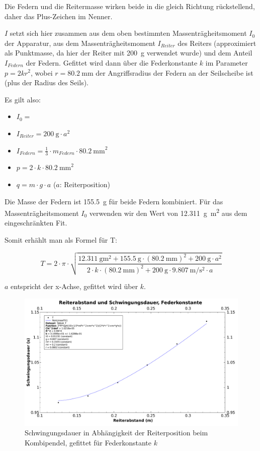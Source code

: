 Die Federn und die Reitermasse wirken beide in die gleich Richtung r\"uckstellend,
daher das Plus-Zeichen im Nenner.

$I$ setzt sich  hier zusammen aus dem  oben bestimmten Massentr\"agheitsmoment
$I_0$ der Apparatur, aus  dem Massentr\"agheitsmoment $I_{Reiter}$ des Reiters
(approximiert  als   Punktmasse,  da  hier  der   Reiter  mit  \SI{200}{\gram}
verwendet  wurde)  und  dem  Anteil  $I_{Federn}$  der  Federn. Gefittet  wird
dann  \"uber die  Federkonstante $k$  im  Parameter $p  = 2kr^2$,  wobei $r  =
\SI{80.2}{\milli\meter}$ der Angriffsradius der  Federn an der Seilscheibe ist
(plus der Radius des Seils).

Es gilt also:
\begin{itemize}
    \item
        $I_0 = $
    \item
        $I_{Reiter} = \SI{200}{\gram} \cdot a^2$
    \item
        $I_{Federn} = \frac{1}{3} \cdot m_{Federn} \cdot \SI{80.2}{\milli\meter}^2$
    \item
        $p = 2 \cdot k \cdot \SI{80.2}{\milli\meter}^2$
    \item
        $q = m \cdot g \cdot a$ ($a$: Reiterposition)
\end{itemize}

Die   Masse   der   Federn    ist   \SI{155.5}{\gram}   f\"ur   beide   Federn
kombiniert. F\"ur das Massentr\"agheitsmoment $I_0$ verwenden wir den Wert von
\SI{12.311}{\gram\meter\squared} aus dem eingeschr\"ankten Fit.

Somit erh\"ahlt man als Formel f\"ur T:

\begin{equation}
    T = 2 \cdot \pi \cdot \sqrt{\frac{\SI{12.311}{\gram\meter\squared} + \SI{155.5}{\gram} \cdot (\SI{80.2}{\milli\meter})^2 + \SI{200}{\gram} \cdot a^2}{2 \cdot k \cdot (\SI{80.2}{\milli\meter})^2 + \SI{200}{\gram} \cdot
    \SI{9.807}{\meter\per\second\squared} \cdot a}}
\end{equation}

$a$ entspricht der x-Achse, gefittet wird \"uber $k$.

\begin{figure}[h!]
    \centering
    \includegraphics[width=\textwidth]{images/331a.pdf}
    \caption{%
        Schwingungsdauer in Abh\"angigkeit der Reiterposition beim Kombipendel, gefittet f\"ur Federkonstante $k$
    }
    \label{fig:331a}
\end{figure}


